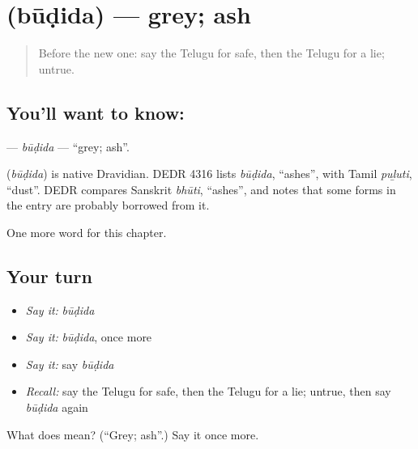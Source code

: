 \section[\texorpdfstring{\te{బూడిద} (būḍida)}{బూడిద (būḍida)}]{ (būḍida) — grey; ash}

\label{lesson:TE-C140-budida}



\begin{quote}
Before the new one: say the Telugu for safe, then the Telugu for a lie; untrue.
\end{quote}

\subsection*{You'll want to know: }
\textbf{} — \emph{būḍida} — \textquotedblleft{}grey; ash\textquotedblright{}.

\begin{cousinweb}
\textbf{} (\emph{būḍida}) is native Dravidian. DEDR 4316 lists \emph{būḍida}, \textquotedblleft{}ashes\textquotedblright{}, with Tamil \emph{puḻuti}, \textquotedblleft{}dust\textquotedblright{}. DEDR compares Sanskrit \emph{bhūti}, \textquotedblleft{}ashes\textquotedblright{}, and notes that some forms in the entry are probably borrowed from it.
\end{cousinweb}

\begin{grammarlens}[title={What you've built}]
One more word for this chapter.
\end{grammarlens}

\subsection*{Your turn}
\begin{itemize}
\raggedright
  \item \emph{Say it:} \emph{būḍida}
  \item \emph{Say it:} \emph{būḍida}, once more
  \item \emph{Say it:} say \emph{būḍida}
  \item \emph{Recall:} say the Telugu for safe, then the Telugu for a lie; untrue, then say \emph{būḍida} again
\end{itemize}

\begin{tcolorbox}[breakable,colback=teal!4,colframe=teal!35!black,title={Before you move on}]
What does  mean? (\textquotedblleft{}Grey; ash\textquotedblright{}.) Say it once more.
\end{tcolorbox}
